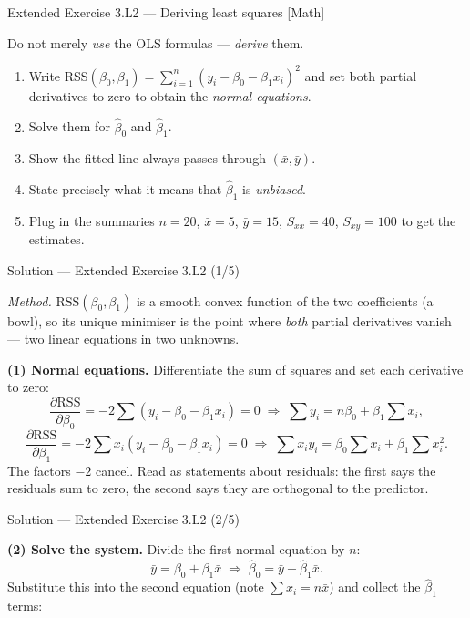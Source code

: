 \documentclass[aspectratio=169,11pt]{beamer}
\begin{document}
\begin{frame}{Extended Exercise 3.L2 --- Deriving least squares [Math]}\label{frm:ee3l2}
  \begin{longexercise}
    Do not merely \emph{use} the OLS formulas --- \emph{derive} them.
    \begin{enumerate}
      \item Write $\mathrm{RSS}(\beta_0,\beta_1)=\sum_{i=1}^{n}(y_i-\beta_0-\beta_1 x_i)^2$
            and set both partial derivatives to zero to obtain the
            \emph{normal equations}.
      \item Solve them for $\hat\beta_0$ and $\hat\beta_1$.
      \item Show the fitted line always passes through $(\bar x,\bar y)$.
      \item State precisely what it means that $\hat\beta_1$ is
            \emph{unbiased}.
      \item Plug in the summaries $n=20$, $\bar x=5$, $\bar y=15$,
            $S_{xx}=40$, $S_{xy}=100$ to get the estimates.
    \end{enumerate}
  \end{longexercise}
\end{frame}

\begin{frame}{Solution --- Extended Exercise 3.L2 (1/5)}
  \begin{solutionbox}
    \emph{Method.} $\mathrm{RSS}(\beta_0,\beta_1)$ is a smooth convex
    function of the two coefficients (a bowl), so its unique minimiser
    is the point where \emph{both} partial derivatives vanish --- two
    linear equations in two unknowns.

    \textbf{(1) Normal equations.} Differentiate the sum of squares and
    set each derivative to zero:
    \[
      \frac{\partial \mathrm{RSS}}{\partial \beta_0}
        =-2\sum (y_i-\beta_0-\beta_1 x_i)=0
        \;\Rightarrow\; \sum y_i=n\beta_0+\beta_1\sum x_i,
    \]
    \[
      \frac{\partial \mathrm{RSS}}{\partial \beta_1}
        =-2\sum x_i(y_i-\beta_0-\beta_1 x_i)=0
        \;\Rightarrow\; \sum x_i y_i=\beta_0\sum x_i+\beta_1\sum x_i^2.
    \]
    The factors $-2$ cancel. Read as statements about residuals: the
    first says the residuals sum to zero, the second says they are
    orthogonal to the predictor.
  \end{solutionbox}
\end{frame}

\begin{frame}{Solution --- Extended Exercise 3.L2 (2/5)}
  \begin{solutionbox}
    \textbf{(2) Solve the system.} Divide the first normal equation by
    $n$:
    \[
      \bar y=\beta_0+\beta_1\bar x
      \;\Rightarrow\; \hat\beta_0=\bar y-\hat\beta_1\bar x.
    \]
    Substitute this into the second equation (note
    $\sum x_i=n\bar x$) and collect the $\hat\beta_1$ terms:
  \end{solutionbox}
\end{frame}
\end{document}
